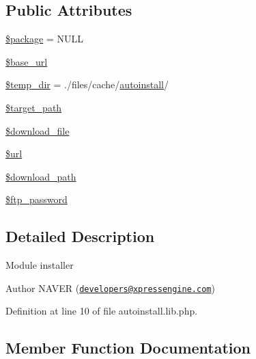 \subsection*{Public Attributes}
\begin{DoxyCompactItemize}
\item 
\hyperlink{classModuleInstaller_a44c1003f12fa92f8b3eda2ec82159ead}{\$package} = N\+U\+LL
\item 
\hyperlink{classModuleInstaller_a292b18d8c31dfa2cbac3bf90520b7128}{\$base\+\_\+url}
\item 
\hyperlink{classModuleInstaller_a65850d513e6f6fdae18ee0654efb956c}{\$temp\+\_\+dir} = \textquotesingle{}./files/cache/\hyperlink{classautoinstall}{autoinstall}/\textquotesingle{}
\item 
\hyperlink{classModuleInstaller_ac689b9d90b9845e4edb9726e5a0c1fd5}{\$target\+\_\+path}
\item 
\hyperlink{classModuleInstaller_a84752841ec1979052e8a2b700e8c93df}{\$download\+\_\+file}
\item 
\hyperlink{classModuleInstaller_a01a6bf5f232c00fff146a58fb8c14b84}{\$url}
\item 
\hyperlink{classModuleInstaller_aa420e990f8276272c79846ad25a54858}{\$download\+\_\+path}
\item 
\hyperlink{classModuleInstaller_ae6f8a411a4905b14ed0c03db7288b169}{\$ftp\+\_\+password}
\end{DoxyCompactItemize}


\subsection{Detailed Description}
Module installer \begin{DoxyAuthor}{Author}
N\+A\+V\+ER (\href{mailto:developers@xpressengine.com}{\tt developers@xpressengine.\+com}) 
\end{DoxyAuthor}


Definition at line 10 of file autoinstall.\+lib.\+php.



\subsection{Member Function Documentation}
\hypertarget{classModuleInstaller_aeaa5ff80b85cbf6718f19e755fcbc016}{}\label{classModuleInstaller_aeaa5ff80b85cbf6718f19e755fcbc016} 
